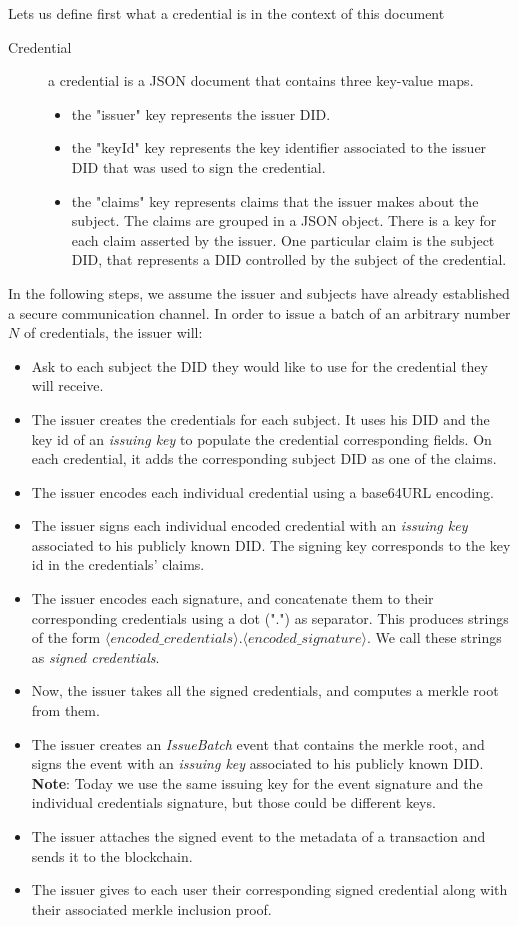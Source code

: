 \documentclass[10pt,a4paper]{article}
\begin{document}
Lets us define first what a credential is in the context of this document

\begin{description}
\item[Credential] a credential is a JSON document that contains three key-value maps.
 \begin{itemize}
 \item the "issuer" key represents the issuer DID.
 \item the "keyId" key represents the key identifier associated to the issuer DID that was used to sign the credential.
 \item the "claims" key represents claims that the issuer makes about the subject. The claims are grouped in a JSON object.
       There is a key for each claim asserted by the issuer. One particular claim is the subject DID, that represents a DID
       controlled by the subject of the credential.
 \end{itemize}
\end{description}

In the following steps, we assume the issuer and subjects have already established a secure communication channel.
In order to issue a batch of an arbitrary number $N$ of credentials, the issuer will:
\begin{itemize}
\item Ask to each subject the DID they would like to use for the credential they will receive.
\item The issuer creates the credentials for each subject. It uses his DID and the key id of an \emph{issuing key} to populate
      the credential corresponding fields. On each credential, it adds the corresponding subject DID as one of the claims.
\item The issuer encodes each individual credential using a base64URL encoding.
\item The issuer signs each individual encoded credential with an \emph{issuing key} associated to his publicly known DID. 
      The signing key corresponds to the key id in the credentials' claims.
\item The issuer encodes each signature, and concatenate them to their corresponding credentials using a dot (".") as separator.
      This produces strings of the form $\langle{}encoded\_credentials\rangle{}.\langle{}encoded\_signature\rangle{}$. We call these strings as \emph{signed credentials}.
\item Now, the issuer takes all the signed credentials, and computes a merkle root from them.
\item The issuer creates an \emph{IssueBatch} event that contains the merkle root, and signs the event with an \emph{issuing key} associated to his publicly known DID. 
\textbf{Note}: Today we use the same issuing key for the event signature and the individual credentials signature, but those could be different keys.
\item The issuer attaches the signed event to the metadata of a transaction and sends it to the blockchain.
\item The issuer gives to each user their corresponding signed credential along with their associated merkle inclusion proof.
\end{itemize}
\end{document}

